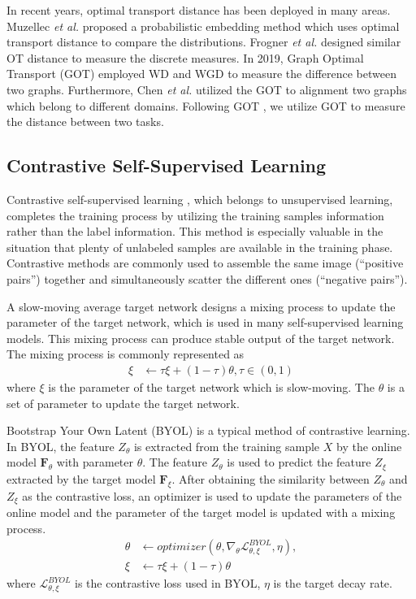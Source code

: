 \documentclass[10pt,journal,compsoc]{IEEEtran}
\begin{document}
In recent years, optimal transport distance has been deployed in many areas. Muzellec \emph{et al.} \cite{ot_distribution_1} proposed a probabilistic embedding method which uses optimal transport distance to compare the distributions. Frogner \emph{et al.} \cite{ot_distribution_2} designed similar OT distance to measure the discrete measures. In 2019, Graph Optimal Transport (GOT) \cite{ot_graph} employed WD and WGD to measure the difference between two graphs. Furthermore, Chen \emph{et al.} \cite{GOT_DA} utilized the GOT to alignment two graphs which belong to different domains. Following GOT \cite{ot_graph,GOT_DA}, we utilize GOT to measure the distance between two tasks.

\subsection{Contrastive Self-Supervised Learning}


Contrastive self-supervised learning \cite{SS_survey}, which belongs to unsupervised learning, completes the training process by utilizing the training samples information rather than the label information. This method is especially valuable in the situation that plenty of unlabeled samples are available in the training phase. Contrastive methods \cite{moco,BYOL} are commonly used to assemble the same image (“positive pairs”) together and simultaneously scatter the different ones (“negative pairs”).

A slow-moving average target network \cite{BYOL} designs a mixing process to update the parameter of the target network, which is used in many self-supervised learning models. This mixing process can produce stable output of the target network. The mixing process is commonly represented as
\begin{align}
    \xi &\gets \tau\xi + (1-\tau)\theta, \tau\in(0,1)
\end{align}
where $\xi$ is the parameter of the target network which is slow-moving. The $\theta$ is a set of parameter to update the target network.

Bootstrap Your Own Latent (BYOL) \cite{BYOL} is a typical method of contrastive learning. In BYOL, the feature $Z_\theta$ is extracted from the training sample $X$ by the online model $\mathbf{F}_\theta$ with parameter $\theta$. The feature $Z_\theta$ is used to predict the feature $Z_\xi$ extracted by the target model $\mathbf{F}_\xi$. After obtaining the similarity between $Z_\theta$ and $Z_\xi$ as the contrastive loss, an optimizer is used to update the parameters of the online model and the parameter of the target model is updated with a mixing process.
\begin{align}
    \theta &\gets optimizer(\theta, \nabla_\theta \mathcal{L}^{BYOL}_{\theta,\xi}, \eta),\\
    \xi &\gets \tau\xi + (1-\tau)\theta
\end{align}
where $\mathcal{L}^{BYOL}_{\theta,\xi}$ is the contrastive loss used in BYOL, $\eta$ is the target decay rate.
\end{document}
